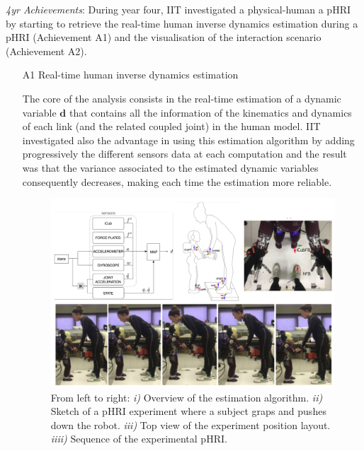 \emph{4yr Achievements}:
During year four,  IIT investigated a physical-human a pHRI by starting to retrieve the real-time human inverse dynamics estimation during a pHRI (Achievement A1) and the visualisation of the interaction scenario (Achievement A2).

\begin{itemize}
\item[A1] Real-time human inverse dynamics estimation

The core of the analysis consists in the real-time estimation of a dynamic variable $\bm d$ that contains all the information of the kinematics and dynamics of each link (and the related coupled joint) in the human model. 
IIT investigated also the advantage in using this estimation algorithm  by adding progressively  the different sensors data at each computation and the result was that the variance associated to the estimated dynamic variables consequently decreases, making each time the estimation more reliable.

\begin{figure}
  \centering
    \includegraphics[width=1\columnwidth]{images/full_A1}
  \caption{From left to right: \emph{i)} Overview of the estimation algorithm. \emph{ii)} Sketch of a pHRI experiment where a subject graps and pushes down the robot. \emph{iii)} Top view of the experiment position layout. \emph{iiii)} Sequence of the experimental pHRI.}
 \label{fig:schemeAlgorithm1}
\end{figure}


\end{itemize}
